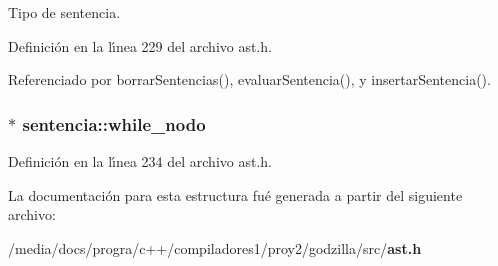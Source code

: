 Tipo de sentencia. 



Definici\'{o}n en la l\'{\i}nea 229 del archivo ast.h.

Referenciado por borrar\-Sentencias(), evaluar\-Sentencia(), y insertar\-Sentencia().
\subsubsection{$\ast$ {\bf sentencia::while\_\-nodo}}\label{structsentencia_o4}




Definici\'{o}n en la l\'{\i}nea 234 del archivo ast.h.

La documentaci\'{o}n para esta estructura fu\'{e} generada a partir del siguiente archivo:\begin{CompactItemize}
\item 
/media/docs/progra/c++/compiladores1/proy2/godzilla/src/{\bf ast.h}\end{CompactItemize}
